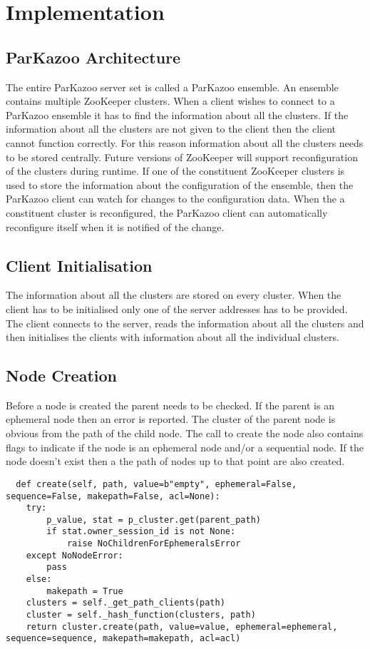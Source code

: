 \chapter{Implementation}

\section{ParKazoo Architecture}
  The entire ParKazoo server set is called a ParKazoo ensemble. An ensemble contains multiple ZooKeeper clusters. When a client wishes to connect to a ParKazoo ensemble it has to find the information about all the clusters. If the information about all the clusters are not given to the client then the client cannot function correctly. For this reason information about all the clusters needs to be stored centrally. Future versions of ZooKeeper will support reconfiguration of the clusters during runtime. If one of the constituent ZooKeeper clusters is used to store the information about the configuration of the ensemble, then the ParKazoo client can watch for changes to the configuration data. When the a constituent cluster is reconfigured, the ParKazoo client can automatically reconfigure itself when it is notified of the change. 


  
\section{Client Initialisation}
    The information about all the clusters are stored on every cluster. When the client has to be initialised only one of the server addresses has to be provided. The client connects to the server, reads the information about all the clusters and then initialises the clients with information about all the individual clusters.

\section{Node Creation}
Before a node is created the parent needs to be checked. If the parent is an ephemeral node then an error is reported. The cluster of the parent node is obvious from the path of the child node. The call to create the node also contains flags to indicate if the node is an ephemeral node and/or a sequential node. If the node doesn't exist then a the path of nodes up to that point are also created.

\begin{lstlisting}
  def create(self, path, value=b"empty", ephemeral=False, sequence=False, makepath=False, acl=None):
    try:
        p_value, stat = p_cluster.get(parent_path)
        if stat.owner_session_id is not None:
            raise NoChildrenForEphemeralsError
    except NoNodeError:
        pass
    else:
        makepath = True
    clusters = self._get_path_clients(path)
    cluster = self._hash_function(clusters, path)
    return cluster.create(path, value=value, ephemeral=ephemeral, sequence=sequence, makepath=makepath, acl=acl)
\end{lstlisting}

